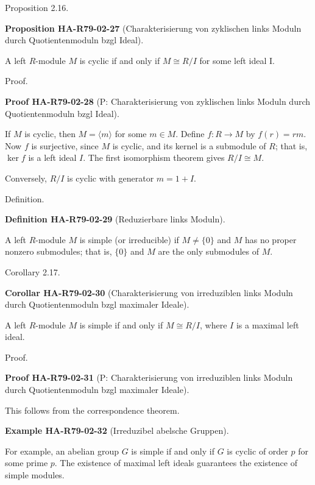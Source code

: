 \documentclass[10pt, letterpaper]{article}
\newcommand{\CustomHeading}[3]{%
  \par\medskip\noindent%
  \textbf{#1 #2} \textnormal{(#3)}.\enskip%
}
\newenvironment{DEF}[2]{\begin{unitbox}\CustomHeading{Definition}{#1}{#2}}{\end{unitbox}}
\newenvironment{PROP}[2]{\begin{unitbox}\CustomHeading{Proposition}{#1}{#2}}{\end{unitbox}}
\newenvironment{KORO}[2]{\begin{unitbox}\CustomHeading{Corollar}{#1}{#2}}{\end{unitbox}}
\newenvironment{EXA}[2]{\begin{unitbox}\CustomHeading{Example}{#1}{#2}}{\end{unitbox}}
\newenvironment{PROOF}[2]{\begin{unitbox}\CustomHeading{Proof}{#1}{#2}}{\end{unitbox}}
\begin{document}
Proposition 2.16. 

\begin{PROP}{HA-R79-02-27}{Charakterisierung von zyklischen  links Moduln durch Quotientenmoduln bzgl Ideal}
A left $R$-module $M$ is cyclic if and only if $M \cong R / I$ for some left ideal I.
\end{PROP}

Proof. 

\begin{PROOF}{HA-R79-02-28}{P: Charakterisierung von zyklischen  links Moduln durch Quotientenmoduln bzgl Ideal}
If $M$ is cyclic, then $M=\langle m\rangle$ for some $m \in M$. Define $f: R \rightarrow M$ by $f(r)=r m$. Now $f$ is surjective, since $M$ is cyclic, and its kernel is a submodule of $R$; that is, $\operatorname{ker} f$ is a left ideal $I$. The first isomorphism theorem gives $R / I \cong M$.

Conversely, $R / I$ is cyclic with generator $m=1+I$.
\end{PROOF}


Definition. 



\begin{DEF}{HA-R79-02-29}{Reduzierbare links Moduln}
A left $R$-module $M$ is simple (or irreducible) if $M \neq\{0\}$ and $M$ has no proper nonzero submodules; that is, $\{0\}$ and $M$ are the only submodules of $M$.
\end{DEF}



Corollary 2.17. 


\begin{KORO}{HA-R79-02-30}{Charakterisierung von irreduziblen links Moduln durch Quotientenmoduln bzgl maximaler Ideale}
A left $R$-module $M$ is simple if and only if $M \cong R / I$, where $I$ is a maximal left ideal.
\end{KORO}

Proof. 

\begin{PROOF}{HA-R79-02-31}{P: Charakterisierung von irreduziblen links Moduln durch Quotientenmoduln bzgl maximaler Ideale}
This follows from the correspondence theorem.
\end{PROOF}


\begin{EXA}{HA-R79-02-32}{Irreduzibel abelsche Gruppen}
For example, an abelian group $G$ is simple if and only if $G$ is cyclic of order $p$ for some prime $p$. The existence of maximal left ideals guarantees the existence of simple modules.
\end{EXA}
\end{document}
